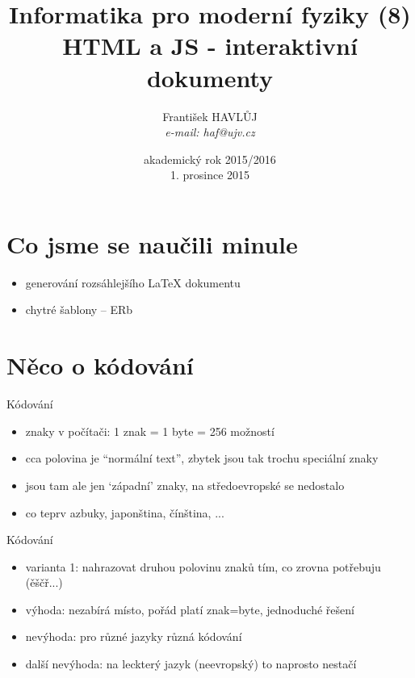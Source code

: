 \documentclass{beamer}
\title[IMF (8)]{Informatika pro moderní fyziky (8)\\ HTML a JS - interaktivní dokumenty}
\author[Franti\v{s}ek HAVL\r{U}J, ORF ÚJV Řež]{Franti\v{s}ek HAVL\r{U}J\\{\scriptsize \emph{e-mail: haf@ujv.cz}}}
\date{akademický rok 2015/2016\\1. prosince 2015}
\institute[ORF ÚJV Řež]
{ÚJV Řež\\oddělení Reaktorové fyziky a podpory palivového cyklu}
\begin{document}
\begin{frame}
  \titlepage
\end{frame}

\begin{frame}
  \tableofcontents
\end{frame}

\section{Co jsme se naučili minule}

\begin{frame}{}
  \begin{itemize}
    \item generování rozsáhlejšího LaTeX dokumentu
    \item chytré šablony -- ERb
  \end{itemize}
\end{frame}

\section{Něco o kódování}

\begin{frame}{Kódování}
  \begin{itemize}
    \item znaky v počítači: 1 znak = 1 byte = 256 možností
    \item cca polovina je ``normální text'', zbytek jsou tak trochu speciální znaky
    \item jsou tam ale jen `západní' znaky, na středoevropské se nedostalo
    \item co teprv azbuky, japonština, čínština, ...
  \end{itemize}
\end{frame}

\begin{frame}{Kódování}
  \begin{itemize}
    \item varianta 1: nahrazovat druhou polovinu znaků tím, co zrovna potřebuju (ěščř...)
    \item výhoda: nezabírá místo, pořád platí znak=byte, jednoduché řešení
    \item nevýhoda: pro různé jazyky různá kódování
    \item další nevýhoda: na leckterý jazyk (neevropský) to naprosto nestačí
  \end{itemize}
\end{frame}
\end{document}
